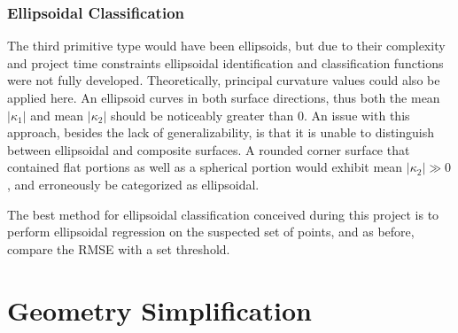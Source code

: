 \subsubsection{Ellipsoidal Classification}
The third primitive type would have been ellipsoids, but due to their complexity and project time constraints ellipsoidal identification and classification functions were not fully developed.
Theoretically, principal curvature values could also be applied here.
An ellipsoid curves in both surface directions, thus both the mean $|\kappa_1|$ and mean $|\kappa_2|$ should be noticeably greater than 0.
An issue with this approach, besides the lack of generalizability, is that it is unable to distinguish between ellipsoidal and composite surfaces.
A rounded corner surface that contained flat portions as well as a spherical portion would exhibit mean $|\kappa_2| \gg 0$, and erroneously be categorized as ellipsoidal.

The best method for ellipsoidal classification conceived during this project is to perform ellipsoidal regression on the suspected set of points, and as before, compare the RMSE with a set threshold.

\section{Geometry Simplification}

